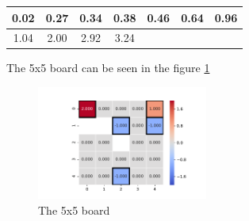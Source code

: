 \documentclass[10pt,journal,compsoc,twoside]{IEEEtran}
\begin{document}
\begin{center}
    \begin{tabular}{ | c | c | c | c | c |  c| c |}
        \hline
        0.02 & 0.27 & 0.34 & 0.38 & 0.46 & 0.64 & 0.96 \\ \hline
         1.04 & 2.00 & 2.92 & 3.24 & & & \\ \hline
    \end{tabular}
\end{center}

The 5x5 board can be seen in the figure \ref{fig:e2board}

\begin{figure}
    \caption{The 5x5 board}
    \label{fig:e2board}
        \includegraphics[width=0.5\textwidth, angle=0]{figures/e2_board.pdf}
\end{figure}
\end{document}
